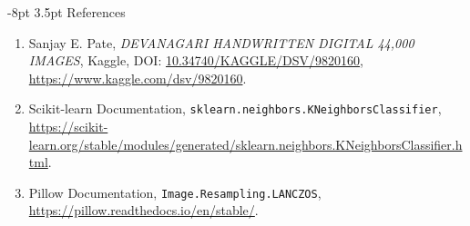 \documentclass[10pt,a4paper]{article}
\makeatletter
\renewcommand\section{\@startsection{section}{1}{\z@}%
  {-8pt \@plus -2pt \@minus -1pt}%
  {3.5pt \@plus 1pt}%
  {\normalfont\fontsize{10.8}{13}\bfseries\color{InkBlack}}}
\makeatother
\begin{document}
\section{References}
\begin{enumerate}\itemsep1.5pt\parskip0pt
  \item Sanjay E. Pate, \emph{DEVANAGARI HANDWRITTEN DIGITAL 44,000 IMAGES}, Kaggle, DOI: \url{10.34740/KAGGLE/DSV/9820160}, \url{https://www.kaggle.com/dsv/9820160}.
  \item Scikit-learn Documentation, \texttt{sklearn.neighbors.KNeighborsClassifier}, \url{https://scikit-learn.org/stable/modules/generated/sklearn.neighbors.KNeighborsClassifier.html}.
  \item Pillow Documentation, \texttt{Image.Resampling.LANCZOS}, \url{https://pillow.readthedocs.io/en/stable/}.
\end{enumerate}
\end{document}
